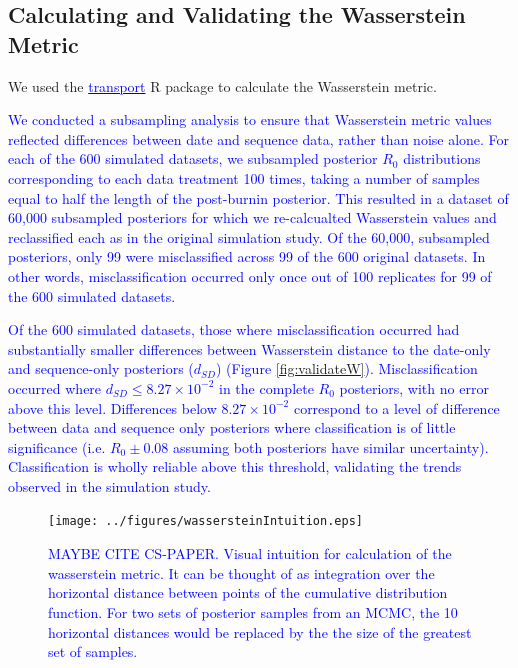 \documentclass{article}
\begin{document}
\subsection*{Calculating and Validating the Wasserstein Metric}
We used the \href{https://www.rdocumentation.org/packages/transport/versions/0.12-2/topics/wasserstein1d}{\textcolor{blue}{transport}} R package to calculate the Wasserstein metric. 

\textcolor{blue}{We conducted a subsampling analysis to ensure that Wasserstein metric values reflected differences between date and sequence data, rather than noise alone. For each of the 600 simulated datasets, we subsampled posterior $R_{0}$ distributions corresponding to each data treatment 100 times, taking a number of samples equal to half the length of the post-burnin posterior. This resulted in a dataset of 60,000 subsampled posteriors for which we re-calcualted Wasserstein values and reclassified each as in the original simulation study. Of the 60,000, subsampled posteriors, only 99 were misclassified across 99 of the 600 original datasets. In other words, misclassification occurred only once out of 100 replicates for 99 of the 600 simulated datasets.}

\textcolor{blue}{Of the 600 simulated datasets, those where misclassification occurred had substantially smaller differences between Wasserstein distance to the date-only and sequence-only posteriors ($d_{SD}$) (Figure \ref{fig:validateW}). Misclassification occurred where $d_{SD} \le 8.27\times10^{-2}$ in the complete $R_0$ posteriors, with no error above this level. Differences below $8.27\times10^{-2}$ correspond to a level of difference between data and sequence only posteriors where classification is of little significance (i.e. $R_0 \pm 0.08$ assuming both posteriors have similar uncertainty). Classification is wholly reliable above this threshold, validating the trends observed in the simulation study.}

\renewcommand{\thefigure}{S\arabic{figure}}
\setcounter{figure}{0}

\begin{figure}[H]
\centering
\texttt{[image: ../figures/wassersteinIntuition.eps]}
\caption{\textcolor{blue}{ MAYBE CITE CS-PAPER. Visual intuition for calculation of the wasserstein metric. It can be thought of as integration over the horizontal distance between points of the cumulative distribution function. For two sets of posterior samples from an MCMC, the 10 horizontal distances would be replaced by the the size of the greatest set of samples.}}
\label{fig:wassIntuition}
\end{figure}
\end{document}
